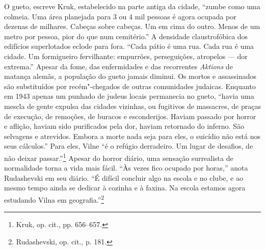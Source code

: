 O gueto, escreve Kruk, estabelecido na parte antiga da cidade, ``zumbe
como uma colmeia. Uma área planejada para 3 ou 4 mil pessoas é agora
ocupada por dezenas de milhares. Cabeças sobre cabeças. Um em cima do
outro. Menos de um metro por pessoa, pior do que num cemitério.'' A
densidade claustrofóbica dos edifícios superlotados eclode para fora.
``Cada pátio é uma rua. Cada rua é uma cidade. Um formigueiro
fervilhante: empurrões, perseguições, atropelos --- dor extrema.'' Apesar
da fome, das enfermidades e das recorrentes \emph{Aktions} de matança
alemãs, a população do gueto jamais diminui. Os mortos e assassinados
são substituídos por recém"-chegados de outras comunidades judaicas.
Enquanto em 1943 apenas um punhado de judeus locais permanecia no gueto,
``havia uma mescla de gente expulsa das cidades vizinhas, ou fugitivos
de massacres, de praças de execução, de remoções, de buracos e
esconderijos. Haviam passado por horror e aflição, haviam sido
purificados pela dor, haviam retornado do inferno. São selvagens e
atrevidos. Embora a morte nada seja para eles, o suicídio não está nos
seus cálculos.'' Para eles, Vilne ``é o refúgio derradeiro. Um lugar de
desafios, de não deixar passar.''\footnote{Kruk, op. cit., pp. 656--657.}
Apesar do horror diário, uma sensação surrealista de normalidade torna a
vida mais fácil. ``Às vezes fico ocupado por horas,'' anota Rudashevski
em seu diário. ``É difícil concluir algo na escola e no clube, e ao
mesmo tempo ainda se dedicar à cozinha e à faxina. Na escola estamos
agora estudando Vilna em geografia.''\footnote{Rudashevski, op. cit., p.
  181.}

